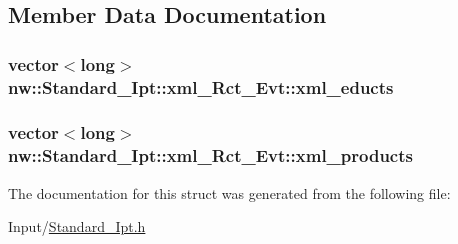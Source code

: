 \subsection{Member Data Documentation}
\hypertarget{structnw_1_1_standard___ipt_1_1xml___rct___evt_a7bee357e0554eb7a6bba9fff6624e5ad}{
\subsubsection[{xml\+\_\+educts}]{\setlength{\rightskip}{0pt plus 5cm}vector$<$long$>$ nw\+::\+Standard\+\_\+\+Ipt\+::xml\+\_\+\+Rct\+\_\+\+Evt\+::xml\+\_\+educts}}\label{structnw_1_1_standard___ipt_1_1xml___rct___evt_a7bee357e0554eb7a6bba9fff6624e5ad}
\hypertarget{structnw_1_1_standard___ipt_1_1xml___rct___evt_a2c8054ac2dbef43234927778f80ae4e6}{
\subsubsection[{xml\+\_\+products}]{\setlength{\rightskip}{0pt plus 5cm}vector$<$long$>$ nw\+::\+Standard\+\_\+\+Ipt\+::xml\+\_\+\+Rct\+\_\+\+Evt\+::xml\+\_\+products}}\label{structnw_1_1_standard___ipt_1_1xml___rct___evt_a2c8054ac2dbef43234927778f80ae4e6}


The documentation for this struct was generated from the following file\+:\begin{DoxyCompactItemize}
\item 
Input/\hyperlink{_standard___ipt_8h}{Standard\+\_\+\+Ipt.\+h}\end{DoxyCompactItemize}
